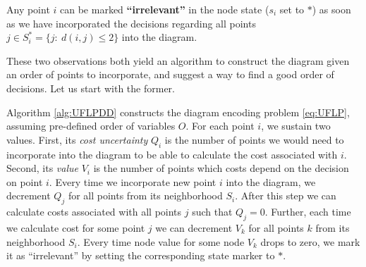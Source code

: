 \documentclass[11pt]{article}
\begin{document}
Any point \textcircled{$i$} can be marked \textbf{``irrelevant''} in the node state
(\(s_i\) set to \(*\)) as soon as we have incorporated the decisions regarding all
points \(j\in S^*_i = \{j:~d(i,j)\leq 2\}\) into the diagram.

These two observations both yield an algorithm to construct the diagram given an
order of points to incorporate, and suggest a way to find a good order of
decisions. Let us start with the former.

Algorithm \ref{alg:UFLPDD} constructs the diagram encoding problem \eqref{eq:UFLP},
assuming pre-defined order of variables \(O\). For each point \textcircled{$i$},
we sustain two values. First, its \emph{cost uncertainty} \(Q_i\) is the number of
points we would need to incorporate into the diagram to be able to calculate the
cost associated with \textcircled{$i$}. Second, its \emph{value} \(V_i\) is the number
of points which costs depend on the decision on point \textcircled{$i$}. Every
time we incorporate new point \textcircled{$i$} into the diagram, we decrement
\(Q_j\) for all points from its neighborhood \(S_i\). After this step we can
calculate costs associated with all points \(j\) such that \(Q_j=0\). Further, each
time we calculate cost for some point \(j\) we can decrement \(V_k\) for all points
\(k\) from its neighborhood \(S_i\). Every time node value for some node \(V_k\) drops
to zero, we mark it as ``irrelevant'' by setting the corresponding state marker
to \(*\).
\end{document}
